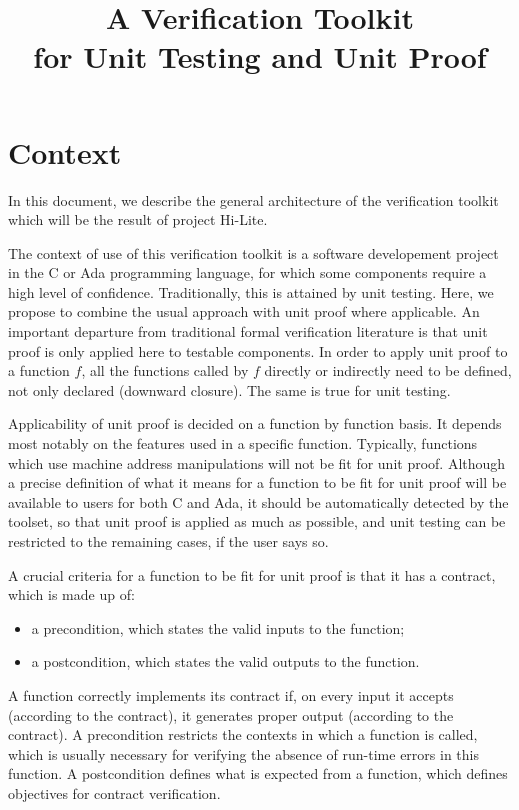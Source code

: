\documentclass{article}
\title{A Verification Toolkit\\for Unit Testing and Unit Proof}
\begin{document}
\maketitle

\section{Context}

In this document, we describe the general architecture of the verification
toolkit which will be the result of project Hi-Lite.

The context of use of this verification toolkit is a software developement
project in the C or Ada programming language, for which some components require
a high level of confidence. Traditionally, this is attained by unit
testing. Here, we propose to combine the usual approach with unit proof where
applicable. An important departure from traditional formal verification
literature is that unit proof is only applied here to testable components.  In
order to apply unit proof to a function $f$, all the functions called by $f$
directly or indirectly need to be defined, not only declared (downward
closure). The same is true for unit testing.

Applicability of unit proof is decided on a function by function basis. It
depends most notably on the features used in a specific function. Typically,
functions which use machine address manipulations will not be fit for unit
proof. Although a precise definition of what it means for a function to be fit
for unit proof will be available to users for both C and Ada, it should be
automatically detected by the toolset, so that unit proof is applied as much as
possible, and unit testing can be restricted to the remaining cases, if the
user says so.

A crucial criteria for a function to be fit for unit proof is that it has a
contract, which is made up of:
\begin{itemize}
\item a precondition, which states the valid inputs to the function;
\item a postcondition, which states the valid outputs to the function.
\end{itemize}

A function correctly implements its contract if, on every input it accepts
(according to the contract), it generates proper output (according to the
contract). A precondition restricts the contexts in which a function is
called, which is usually necessary for verifying the absence of run-time errors
in this function.  A postcondition defines what is expected from a function,
which defines objectives for contract verification.
\end{document}
